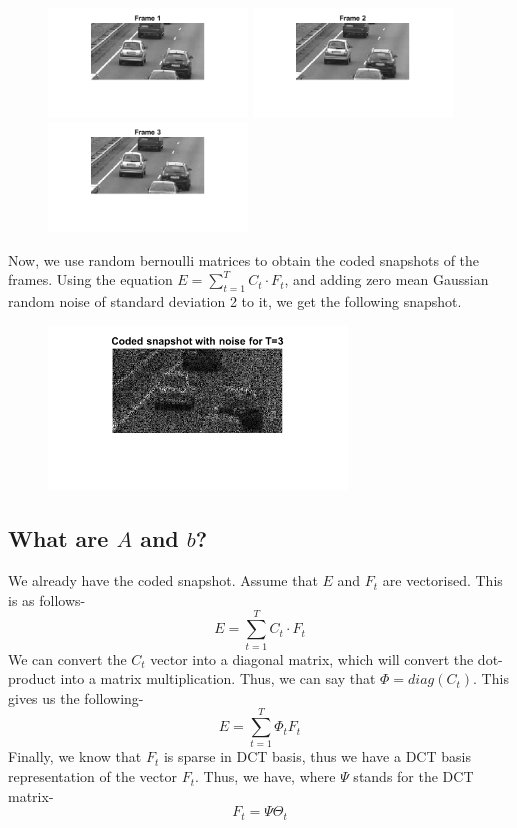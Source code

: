\documentclass[a4paper,11pt]{article}
\numberwithin{definition}{section}
\numberwithin{mytheorem}{subsection}
\begin{document}
\begin{figure}[!h]
    \centering
    \includegraphics[width=200px]{"Frame 1.png"}
    \includegraphics[width=200px]{"Frame 2.png"}
    \includegraphics[width=200px]{"Frame 3.png"}
\end{figure}

Now, we use random bernoulli matrices to obtain the coded snapshots of the frames. Using the equation $E = \sum \limits_{t=1}^TC_t \cdot F_t$, and adding zero mean Gaussian random noise of standard deviation 2 to it, we get the following snapshot.


\begin{figure}[!h]
    \centering
    \includegraphics[width=300px]{"Coded_Snapshot_T=3.png"}
\end{figure}


\subsection{What are $A$ and $b$?}

We already have the coded snapshot. Assume that $E$ and $F_t$ are vectorised. This is as follows-
$$E = \sum \limits_{t=1}^TC_t \cdot F_t$$
We can convert the $C_t$ vector into a diagonal matrix, which will convert the dot-product into a matrix multiplication. Thus, we can say that $\Phi = diag(C_t)$. This gives us the following-
$$E = \sum \limits_{t=1}^T\Phi_t F_t$$
Finally, we know that $F_t$ is sparse in DCT basis, thus we have a DCT basis representation of the vector $F_t$.
Thus, we have, where $\Psi$ stands for the DCT matrix-
$$F_t = \Psi \Theta_t$$
\end{document}
